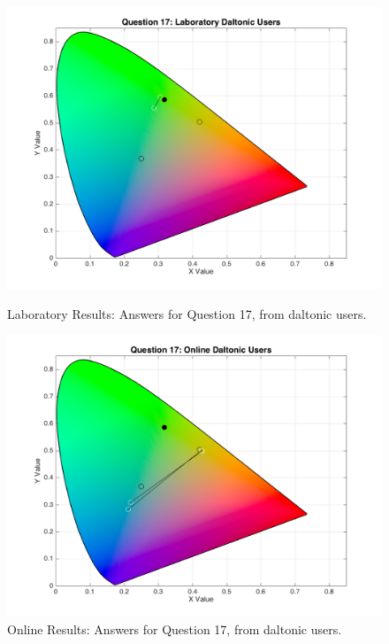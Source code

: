 \begin{figure}[!htbp]
  \centering
  \begin{minipage}{0.48\textwidth}
    \centering
    \includegraphics[width=\textwidth]{images/results/17_lab_daltonicUsers.png}
    \caption[Laboratory Results: Answers for Question 17, from daltonic users.]{Laboratory Results: Answers for Question 17, from daltonic users.}
    \label{fig:dalt_3}
  \end{minipage}\hfill
  \begin{minipage}{0.48\textwidth}
    \centering
    \includegraphics[width=\textwidth]{images/results/17_online_daltonicUsers.png}
    \caption[Online Results: Answers for Question 17, from daltonic users.]{Online Results: Answers for Question 17, from daltonic users.}
    \label{fig:dalt_4}
  \end{minipage}
\end{figure} \\ \par
